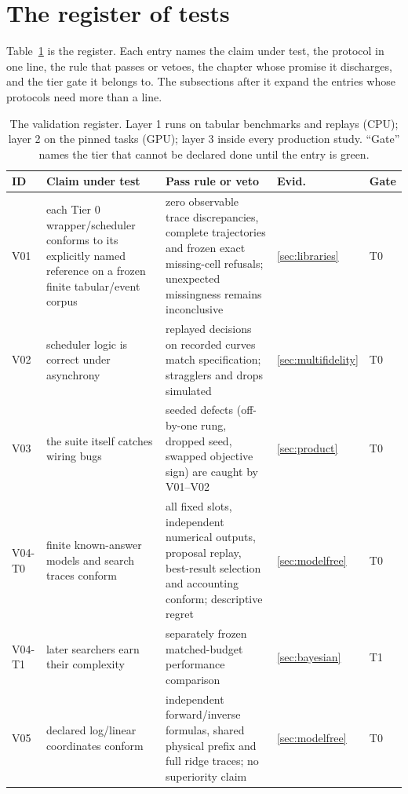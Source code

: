 \section{The register of tests}

Table~\ref{tab:suite} is the register. Each entry names the claim
under test, the protocol in one line, the rule that passes or vetoes,
the chapter whose promise it discharges, and the tier gate it
belongs to. The subsections after it expand the entries whose
protocols need more than a line.

\begin{table}[tp]
\centering
\footnotesize
\renewcommand{\arraystretch}{0.95}
\caption{The validation register. Layer 1 runs on tabular benchmarks
and replays (CPU); layer 2 on the pinned tasks (GPU); layer 3 inside
every production study. ``Gate'' names the tier that cannot be
declared done until the entry is green.}
\label{tab:suite}
\begin{tabularx}{\textwidth}{@{}l>{\raggedright\arraybackslash}X>{\raggedright\arraybackslash}Xll@{}}
\toprule
ID & Claim under test & Pass rule or veto & Evid. & Gate \\
\midrule
V01 & each Tier 0 wrapper/scheduler conforms to its explicitly named
reference on a frozen finite tabular/event corpus & zero observable
trace discrepancies, complete trajectories and frozen exact missing-cell
refusals; unexpected missingness remains inconclusive & \ref{sec:libraries} & T0 \\
V02 & scheduler logic is correct under asynchrony & replayed
decisions on recorded curves match specification; stragglers and
drops simulated & \ref{sec:multifidelity} & T0 \\
V03 & the suite itself catches wiring bugs & seeded defects
(off-by-one rung, dropped seed, swapped objective sign) are caught
by V01--V02 & \ref{sec:product} & T0 \\
V04-T0 & finite known-answer models and search traces conform & all
fixed slots, independent numerical outputs, proposal replay, best-result
selection and accounting conform; descriptive regret & \ref{sec:modelfree} & T0 \\
V04-T1 & later searchers earn their complexity & separately frozen
matched-budget performance comparison & \ref{sec:bayesian} & T1 \\
V05 & declared log/linear coordinates conform & independent forward/inverse
formulas, shared physical prefix and full ridge traces; no superiority claim
& \ref{sec:modelfree} & T0 \\

\end{tabularx}
\end{table}
